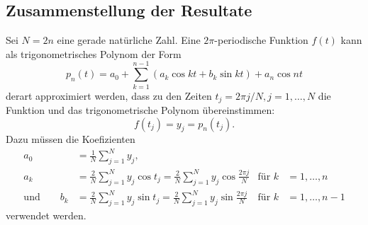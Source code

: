 \subsection{Zusammenstellung der Resultate}
Sei $N=2n$ eine gerade natürliche Zahl.
Eine $2\pi$-periodische Funktion $f(t)$ kann als trigonometrisches Polynom
der Form
\[
p_n(t)
=
a_0 + \sum_{k=1}^{n-1} (a_k\cos kt + b_k\sin kt) + a_n\cos nt
\]
derart approximiert werden, dass zu den Zeiten $t_j=2\pi j/N, j=1,\dots,N$ 
die Funktion und das trigonometrische Polynom übereinstimmen:
\[
f(t_j) = y_j = p_n(t_j).
\]
Dazu müssen die Koefizienten
\begin{align*}
a_0
&=
\frac{1}N
\sum_{j=1}^N y_j,
\\
a_k
&=
\frac{2}N
\sum_{j=1}^N y_j\cos t_j
=
\frac{2}N
\sum_{j=1}^N y_j\cos \frac{2\pi j}{N}&\text{für }k&=1,\dots,n
\\
\text{und}\qquad
b_k
&=
\frac{2}N
\sum_{j=1}^N y_j\sin t_j
=
\frac{2}N
\sum_{j=1}^N y_j\sin \frac{2\pi j}{N}&\text{für }k&=1,\dots,n-1
\end{align*}
verwendet werden.

